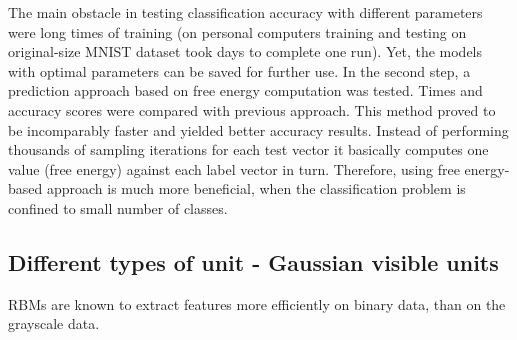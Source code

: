 \documentclass[a4paper]{scrartcl}
\begin{document}
The main obstacle in testing classification accuracy with different parameters were long times of training (on personal computers training and testing on original-size MNIST dataset took days to complete one run). Yet, the models with optimal parameters can be saved for further use.
In the second step, a prediction approach based on free energy computation was tested. Times and accuracy scores were compared with previous approach. This method proved to be incomparably faster and yielded better accuracy results. Instead of performing thousands of sampling iterations for each test vector it basically computes one value (free energy) against each label vector in turn. Therefore, using free energy-based approach is much more beneficial, when the classification problem is confined to small number of classes. 
\subsection{Different types of unit - Gaussian visible units}
RBMs are known to extract features more efficiently on binary data, than on the grayscale data.
\end{document}
